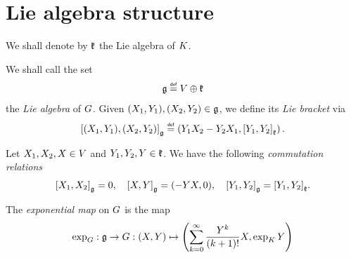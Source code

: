\section{Lie algebra structure}

We shall denote by $\LieAlgebraCompactGroup$ the Lie algebra of $\CompactGroup$.

\begin{definition}
    We shall call the set
    \begin{align*}
        \LieAlgebra \defeq
        \VectorSpace \oplus \LieAlgebraCompactGroup
    \end{align*}
    the \emph{Lie algebra} of $\Group$.  
    Given $(X_1, Y_1), (X_2, Y_2) \in \LieAlgebra$,
    we define its \emph{Lie bracket} via
    \begin{align*}
        \LieBracket{(X_1, Y_1)}{(X_2, Y_2)}
        \defeq \left(Y_1 X_2 - Y_2 X_1, \LieBracket[\LieAlgebraCompactGroup]{Y_1}{Y_2}\right).
    \end{align*}
\end{definition}

\begin{lemma}
    Let $X_1, X_2, X \in \VectorSpace$ and $Y_1, Y_2, Y \in \LieAlgebraCompactGroup$.
    We have the following \emph{commutation relations}
    \begin{align*}
        \LieBracket{X_1}{X_2} = 0,\quad
        \LieBracket{X}{Y} = (-Y X, 0),\quad
        \LieBracket{Y_1}{Y_2} = \LieBracket[\LieAlgebraCompactGroup]{Y_1}{Y_2}.
    \end{align*}
\end{lemma}

\begin{definition}
\label{definition:exponential_map}
    The \emph{exponential map} on $\Group$ is the map
    \begin{align*}
        \exp_\Group : \LieAlgebra \to \Group : (X, Y) \mapsto \left(\sum_{k = 0}^\infty \frac{Y^k}{{(k + 1)}!} X, \exp_\CompactGroup Y\right)
    \end{align*}
\end{definition}

